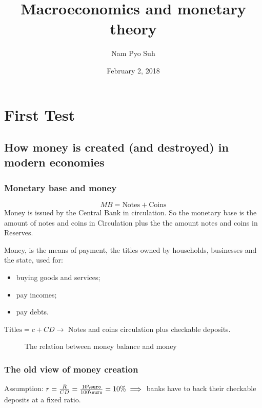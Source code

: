 \documentclass{report}
\title{Macroeconomics and monetary theory}
\author{Nam Pyo Suh}
\date{February 2, 2018}
\begin{document}
\part{First Test}
\chapter{How money is created (and destroyed) in modern economies}
\section{Monetary base and money}

$$MB=\text{Notes} + \text{Coins}$$ Money is issued by the Central Bank in circulation. So the monetary base is the amount of notes and coins in Circulation plus the the amount notes and coins in Reserves. 

Money, is the means of payment, the titles owned by households, businesses and the state, used for:
\begin{itemize}
    \item buying goods and services; 
    \item pay incomes; 
    \item pay debts.
\end{itemize}

$\text{Titles}=c+CD \longrightarrow $ Notes and coins circulation plus checkable deposits.

\begin{figure}[H]
    \centering
{}
    \caption{The relation between money balance and money}
    \label{fig:my_label}
\end{figure}

\clearpage
\section{The old view of money creation}

Assumption: $r=\frac{R}{CD}=\frac{10\text{\euro}}{100\text{\euro}}=10\% \implies$ banks have to back their checkable deposits at a fixed ratio.
\end{document}
